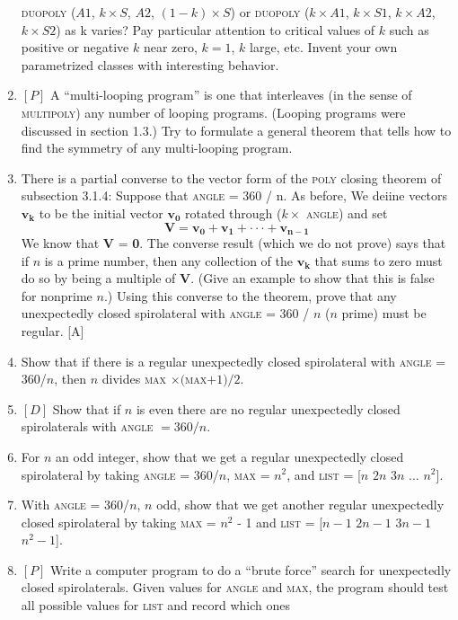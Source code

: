 \documentclass{book}
\begin{document}
\begin{enumerate}
\textsc{duopoly} ($A1$, $k \times S$, $A2$, $(1 - k) \times S$) or \textsc{duopoly} ($k \times A1$, $k \times S1$,
$k \times A2$, $k \times S2$) as k varies? Pay particular attention to critical values
of $k$ such as positive or negative $k$ near zero, $k = 1$, $k$ large, etc. Invent
your own parametrized classes with interesting behavior.
\item $[P]$ A ``multi-looping program'' is one that interleaves (in the sense of
\textsc{multipoly}) any number of looping programs. (Looping programs were
discussed in section 1.3.) Try to formulate a general theorem that tells
how to find the symmetry of any multi-looping program.
\item There is a partial converse to the vector form of the \textsc{poly} closing
theorem of subsection 3.1.4: Suppose that \textsc{angle} = 360 / n. As before, We
deiine vectors $\mathbf{v_k}$ to be the initial vector $\mathbf{v_0}$ rotated through ($k \times $ \textsc{angle})
and set
$$\mathbf{V}=\mathbf{v_0}+\mathbf{v_1}+\cdot \cdot \cdot+\mathbf{v_{n-1}}$$
 We know that \textbf{V} = \textbf{0}. The converse result (which we do not prove) says
that if $n$ is a prime number, then any collection of the $\mathbf{v_k}$ that sums to
zero must do so by being a multiple of \textbf{V}. (Give an example to show
that this is false for nonprime $n$.) Using this converse to the theorem,
prove that any unexpectedly closed spirolateral with \textsc{angle} = 360 / $n$ ($n$
prime) must be regular. [A]
\item Show that if there is a regular unexpectedly closed spirolateral with
\textsc{angle} = 360/$n$, then $n$ divides \textsc{max} $\times ($\textsc{max}$ + 1)/2$.  
\item $[D]$ Show that if $n$ is even there are no regular unexpectedly closed
spirolaterals with \textsc{angle} $= 360 / n$.  
\item For $n$ an odd integer, show that we get a regular unexpectedly
closed spirolateral by taking \textsc{angle} = 360/$n$, \textsc{max} = $n^2$, and \textsc{list} = [$n$ $2n$ $3n$ ... $n^2$].
\item With \textsc{angle} = 360/$n$, $n$ odd, show that we get another regular
unexpectedly closed spirolateral by taking \textsc{max} = $n^2$ - 1 and \textsc{list} = [$n-1$ $2n-1$ $3n-1$ $n^2-1$].
\item $[P]$ Write a computer program to do a ``brute force'' search for
unexpectedly closed spirolaterals. Given values for \textsc{angle} and \textsc{max}, the
program should test all possible values for \textsc{list} and record which ones

\end{enumerate}
\end{document}
